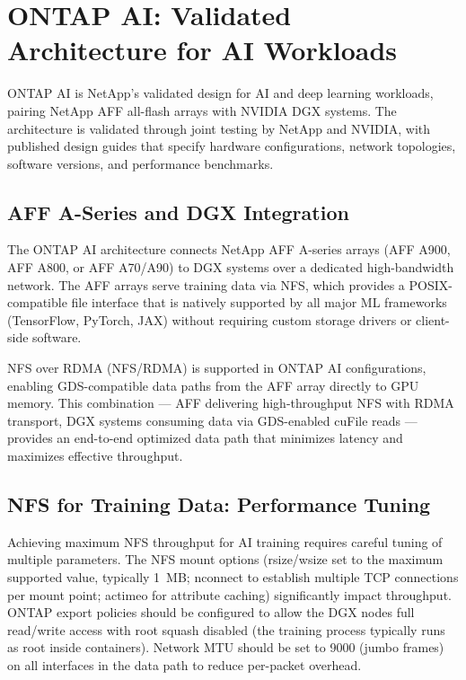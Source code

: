 \section{ONTAP AI: Validated Architecture for AI Workloads}

ONTAP AI is NetApp's validated design for AI and deep learning workloads,
pairing NetApp AFF all-flash arrays with NVIDIA DGX systems. The architecture
is validated through joint testing by NetApp and NVIDIA, with published design
guides that specify hardware configurations, network topologies, software
versions, and performance benchmarks.

\subsection{AFF A-Series and DGX Integration}

The ONTAP AI architecture connects NetApp AFF A-series arrays (AFF A900, AFF
A800, or AFF A70/A90) to DGX systems over a dedicated high-bandwidth network.
The AFF arrays serve training data via NFS, which provides a POSIX-compatible
file interface that is natively supported by all major ML frameworks
(TensorFlow, PyTorch, JAX) without requiring custom storage drivers or
client-side software.

NFS over RDMA (NFS/RDMA) is supported in ONTAP AI configurations, enabling
GDS-compatible data paths from the AFF array directly to GPU memory. This
combination --- AFF delivering high-throughput NFS with RDMA transport, DGX
systems consuming data via GDS-enabled cuFile reads --- provides an end-to-end
optimized data path that minimizes latency and maximizes effective throughput.

\subsection{NFS for Training Data: Performance Tuning}

Achieving maximum NFS throughput for AI training requires careful tuning of
multiple parameters. The NFS mount options (rsize/wsize set to the maximum
supported value, typically 1~MB; nconnect to establish multiple TCP connections
per mount point; actimeo for attribute caching) significantly impact
throughput. ONTAP export policies should be configured to allow the DGX nodes
full read/write access with root squash disabled (the training process
typically runs as root inside containers). Network MTU should be set to 9000
(jumbo frames) on all interfaces in the data path to reduce per-packet
overhead.

